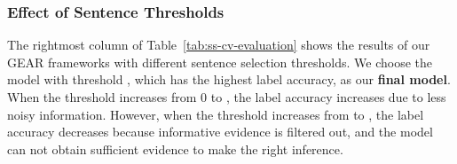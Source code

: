\documentclass[11pt,a4paper]{article}
\begin{document}
\begin{table}[t]
\begin{center}
\end{center}
\caption{\label{tab:enhanced} Label accuracy on the evidence-enhanced dev set with different ERNet layers and evidence aggregators (\%).}
\end{table}


\begin{table}[t]
\begin{center}
\end{center}
\caption{\label{tab:pipeline} Evaluations of the full pipeline. The results of our pipeline are chosen from the model which has the highest dev FEVER score (\%).}
\end{table}


\subsubsection*{Effect of Sentence Thresholds}
The rightmost column of Table~\ref{tab:ss-cv-evaluation} shows the results of our GEAR frameworks with different sentence selection thresholds. We choose the model with threshold , which has the highest label accuracy, as our \textbf{final model}. When the threshold increases from 0 to , the label accuracy increases due to less noisy information. However, when the threshold increases from  to , the label accuracy decreases because informative evidence is filtered out, and the model can not obtain sufficient evidence to make the right inference.
\end{document}
